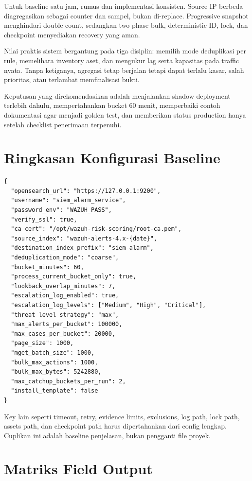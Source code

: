 \documentclass[11pt,a4paper,oneside]{report}
\begin{document}
Untuk baseline satu jam, rumus dan implementasi konsisten. Source IP berbeda
diagregasikan sebagai counter dan sampel, bukan di-replace. Progressive snapshot
menghindari double count, sedangkan two-phase bulk, deterministic ID, lock, dan
checkpoint menyediakan recovery yang aman.

Nilai praktis sistem bergantung pada tiga disiplin: memilih mode deduplikasi per
rule, memelihara inventory aset, dan mengukur lag serta kapasitas pada traffic nyata.
Tanpa ketiganya, agregasi tetap berjalan tetapi dapat terlalu kasar, salah prioritas,
atau terlambat memfinalisasi bukti.

Keputusan yang direkomendasikan adalah menjalankan shadow deployment terlebih dahulu,
mempertahankan bucket 60 menit, memperbaiki contoh dokumentasi agar menjadi golden
test, dan memberikan status production hanya setelah checklist penerimaan terpenuhi.

\appendix

\chapter{Ringkasan Konfigurasi Baseline}

\begin{lstlisting}
{
  "opensearch_url": "https://127.0.0.1:9200",
  "username": "siem_alarm_service",
  "password_env": "WAZUH_PASS",
  "verify_ssl": true,
  "ca_cert": "/opt/wazuh-risk-scoring/root-ca.pem",
  "source_index": "wazuh-alerts-4.x-{date}",
  "destination_index_prefix": "siem-alarm",
  "deduplication_mode": "coarse",
  "bucket_minutes": 60,
  "process_current_bucket_only": true,
  "lookback_overlap_minutes": 7,
  "escalation_log_enabled": true,
  "escalation_log_levels": ["Medium", "High", "Critical"],
  "threat_level_strategy": "max",
  "max_alerts_per_bucket": 100000,
  "max_cases_per_bucket": 20000,
  "page_size": 1000,
  "mget_batch_size": 1000,
  "bulk_max_actions": 1000,
  "bulk_max_bytes": 5242880,
  "max_catchup_buckets_per_run": 2,
  "install_template": false
}
\end{lstlisting}

Key lain seperti timeout, retry, evidence limits, exclusions, log path, lock path,
assets path, dan checkpoint path harus dipertahankan dari config lengkap. Cuplikan
ini adalah baseline penjelasan, bukan pengganti file proyek.

\chapter{Matriks Field Output}
\end{document}
